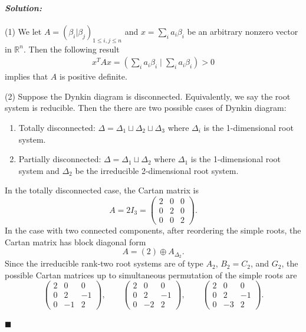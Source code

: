 \documentclass[12pt, a4paper]{article}
\newcommand{\R}{\mathbb{R}}
\newenvironment{solution}
  {\paragraph{\textit{Solution:}}\par\medskip}
  {\hfill$\blacksquare$\vspace{0.1cm}}
\begin{document}
\begin{solution}
  (1) We let $A=(\beta_i|\beta_j)_{1 \le i, j \le n}$ and $x=\sum_{i}a_i \beta_i$ be an arbitrary nonzero vector in $\R^n$. Then the following result 
  \begin{align*}
    x^T A x = \left(\sum_i a_i\beta_i\mid \sum_i a_i\beta_i\right) > 0
  \end{align*}
  implies that $A$ is positive definite. 

  (2) Suppose the Dynkin diagram is disconnected. Equivalently, we say the root system is reducible. Then the there are two possible cases of Dynkin diagram:
  \begin{enumerate}
    \item Totally disconnected: $\Delta = \Delta_1\sqcup \Delta_2 \sqcup \Delta_3$ where $\Delta_i$ is the 1-dimensional root system.
    \item Partially disconnected: $\Delta= \Delta_1 \sqcup \Delta_2$ where $\Delta_1$ is the 1-dimensional root system and $\Delta_2$ be the irreducible 2-dimensional root system.
  \end{enumerate}
  In the totally disconnected case, the Cartan matrix is
\[
A=2I_3=
\begin{pmatrix}
2&0&0\\
0&2&0\\
0&0&2
\end{pmatrix}.
\]
In the case with two connected components, after reordering the simple roots, the Cartan matrix has block diagonal form
\[
A=(2)\oplus A_{\Delta_2}.
\]
Since the irreducible rank-two root systems are of type \(A_2\), \(B_2=C_2\), and \(G_2\), the possible Cartan matrices up to simultaneous permutation of the simple roots are
\[
\begin{pmatrix}
2&0&0\\
0&2&-1\\
0&-1&2
\end{pmatrix},
\qquad
\begin{pmatrix}
2&0&0\\
0&2&-1\\
0&-2&2
\end{pmatrix},
\qquad
\begin{pmatrix}
2&0&0\\
0&2&-1\\
0&-3&2
\end{pmatrix}.
\]


\end{solution}
\end{document}
